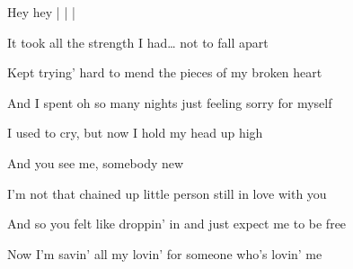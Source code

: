 \begin{song}
\begin{chorusbox}{\PrechorusAndChorus}
\bigskip

Hey hey  |   |   |   \par
\end{chorusbox}

\bigskip

It took all the strength I had… not to fall apart \par
Kept trying' hard to mend the pieces of my broken heart \par
And I spent oh so many nights just feeling sorry for myself \par
I used to cry, but now I hold my head up high \par

\bigskip

And you see me, somebody new \par
I'm not that chained up little person still in love with you \par
And so you felt like droppin' in and just expect me to be free \par
Now I'm savin' all my lovin' for someone who's lovin' me \par

\bigskip

\PrechorusAndChorus

\bigskip

 \par

\end{song}